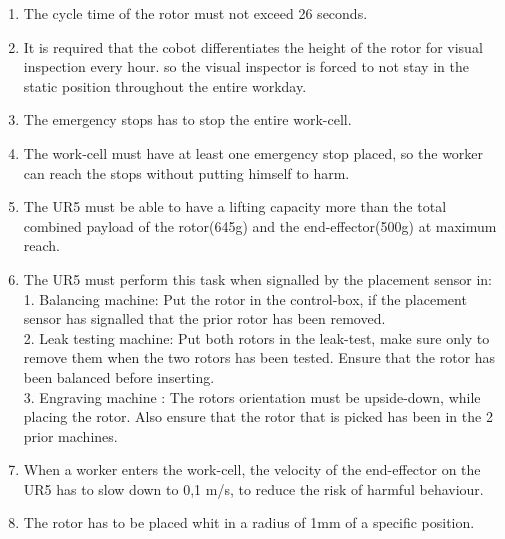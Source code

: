 \begin{enumerate}
    \item The cycle time of the rotor must not exceed 26 seconds.
    \item It is required that the cobot differentiates the height of the rotor for visual inspection every hour. so the visual inspector is forced to not stay in the static position throughout the entire workday.
    \item The emergency stops has to stop the entire work-cell.
    \item The work-cell must have at least one emergency stop placed, so the worker can reach the stops without putting himself to harm.
    \item The UR5 must be able to have a lifting capacity more than the total combined payload of the rotor(645g) and the end-effector(500g) at maximum reach.
    \item The UR5 must perform this task when signalled by the placement sensor in:\\
    1. Balancing machine: Put the rotor in the control-box, if the placement sensor has signalled that the prior rotor has been removed.\\
    2. Leak testing machine: Put both rotors in the leak-test, make sure only to remove them when the two rotors has been tested. Ensure that the rotor has been balanced before inserting.\\
    3. Engraving machine : The rotors orientation must be upside-down, while placing the rotor. Also ensure that the rotor that is picked has been in the 2 prior machines.
    \item When a worker enters the work-cell, the velocity of the end-effector on the UR5 has to slow down to 0,1 m/s, to reduce the risk of harmful behaviour.\\
    \item The rotor has to be placed whit in a radius of 1mm of a specific position. 
    \end{enumerate}

